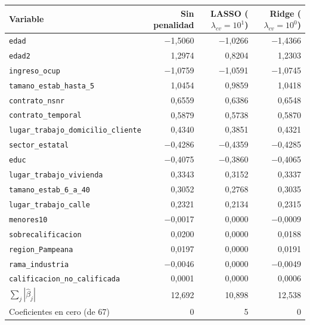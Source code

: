 \begin{tabular}{lrrr}
\toprule
Variable & Sin penalidad & LASSO ($\lambda_{cv} = 10^{1}$) & Ridge ($\lambda_{cv} = 10^{0}$) \\
\midrule
\texttt{edad} & $-$1,5060 & $-$1,0266 & $-$1,4366 \\
\texttt{edad2} & 1,2974 & 0,8204 & 1,2303 \\
\texttt{ingreso\_ocup} & $-$1,0759 & $-$1,0591 & $-$1,0745 \\
\texttt{tamano\_estab\_hasta\_5} & 1,0454 & 0,9859 & 1,0418 \\
\texttt{contrato\_nsnr} & 0,6559 & 0,6386 & 0,6548 \\
\texttt{contrato\_temporal} & 0,5879 & 0,5738 & 0,5870 \\
\texttt{lugar\_trabajo\_domicilio\_cliente} & 0,4340 & 0,3851 & 0,4321 \\
\texttt{sector\_estatal} & $-$0,4286 & $-$0,4359 & $-$0,4285 \\
\texttt{educ} & $-$0,4075 & $-$0,3860 & $-$0,4065 \\
\texttt{lugar\_trabajo\_vivienda} & 0,3343 & 0,3152 & 0,3337 \\
\texttt{tamano\_estab\_6\_a\_40} & 0,3052 & 0,2768 & 0,3035 \\
\texttt{lugar\_trabajo\_calle} & 0,2321 & 0,2134 & 0,2315 \\
\texttt{menores10} & $-$0,0017 & 0,0000 & $-$0,0009 \\
\texttt{sobrecalificacion} & 0,0200 & 0,0000 & 0,0188 \\
\texttt{region\_Pampeana} & 0,0197 & 0,0000 & 0,0191 \\
\texttt{rama\_industria} & $-$0,0046 & 0,0000 & $-$0,0049 \\
\texttt{calificacion\_no\_calificada} & 0,0001 & 0,0000 & 0,0006 \\
\midrule
$\sum_j |\hat\beta_j|$ & 12,692 & 10,898 & 12,538 \\
Coeficientes en cero (de 67) & 0 & 5 & 0 \\
\bottomrule
\end{tabular}